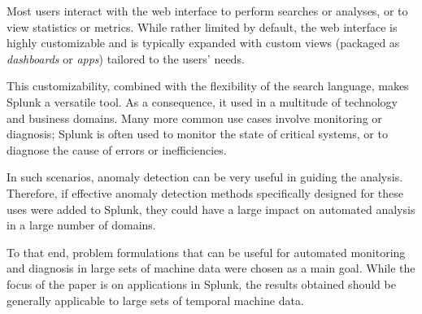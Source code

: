 Most users interact with the web interface to perform searches or analyses, or to view statistics or metrics. While rather limited by default, the web interface is highly customizable and is typically expanded with custom views (packaged as \emph{dashboards} or \emph{apps}) tailored to the users' needs.

This customizability, combined with the flexibility of the search language, makes Splunk a versatile tool. As a consequence, it  used in a multitude of technology and business domains. Many more common use cases involve monitoring or diagnosis; Splunk is often used to monitor the state of critical systems, or to diagnose the cause of errors or inefficiencies.

In such scenarios, anomaly detection can be very useful in guiding the analysis. Therefore, if effective anomaly detection methods specifically designed for these uses were added to Splunk, they could have a large impact on automated analysis in a large number of domains.

To that end, problem formulations that can be useful for automated monitoring and diagnosis in large sets of machine data were chosen as a main goal. While the focus of the paper is on applications in Splunk, the results obtained should be generally applicable to large sets of temporal machine data.
